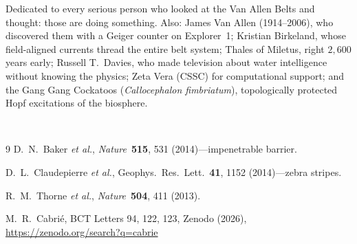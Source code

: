 \documentclass[aps,prl,twocolumn,superscriptaddress,floatfix]{revtex4-2}
\begin{document}
\begin{acknowledgments}
Dedicated to every serious person who looked at the Van Allen Belts and
thought: those are doing something. Also: James Van Allen (1914--2006),
who discovered them with a Geiger counter on Explorer~1; Kristian
Birkeland, whose field-aligned currents thread the entire belt system;
Thales of Miletus, right $2{,}600$ years early; Russell T.~Davies, who
made television about water intelligence without knowing the physics;
Zeta Vera (CSSC) for computational support; and the Gang Gang Cockatoos
(\textit{Callocephalon fimbriatum}), topologically protected Hopf
excitations of the biosphere.

\vspace{2pt}
\\
\end{acknowledgments}

\begin{thebibliography}{9}
D.~N.~Baker \textit{et al.},
\textit{Nature}~\textbf{515}, 531 (2014)---impenetrable barrier.

D.~L.~Claudepierre \textit{et al.},
Geophys.~Res.~Lett.~\textbf{41}, 1152 (2014)---zebra stripes.

R.~M.~Thorne \textit{et al.},
\textit{Nature}~\textbf{504}, 411 (2013).

M.~R.~Cabri\'{e}, BCT Letters 94, 122, 123, Zenodo (2026),
\url{https://zenodo.org/search?q=cabrie}
\end{thebibliography}
\end{document}
